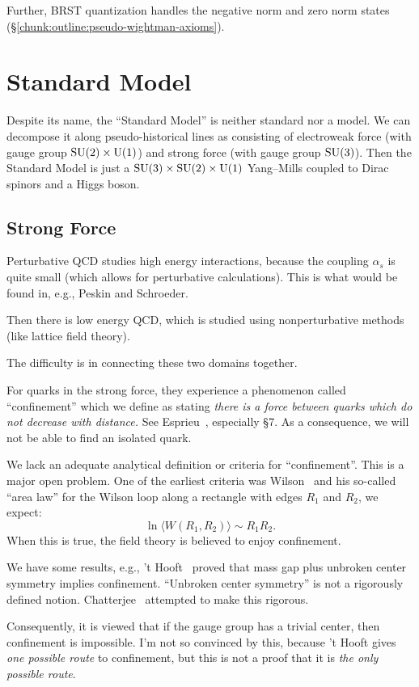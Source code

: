 Further, BRST quantization handles the negative norm and zero norm
states (\S\ref{chunk:outline:pseudo-wightman-axioms}).

\section{Standard Model}

\M
Despite its name, the ``Standard Model'' is neither standard nor a
model. We can decompose it along pseudo-historical lines as consisting
of electroweak force (with gauge group $\operatorname{SU}(2)\times\operatorname{U}(1)$)
and strong force (with gauge group $\operatorname{SU}(3)$). Then the Standard Model
is just a $\operatorname{SU}(3)\times\operatorname{SU}(2)\times\operatorname{U}(1)$ Yang--Mills coupled
to Dirac spinors and a Higgs boson.

\subsection{Strong Force}


\M
Perturbative QCD studies high energy interactions, because the coupling
$\alpha_{s}$ is quite small (which allows for perturbative calculations).
This is what would be found in, e.g., Peskin and Schroeder.

Then there is low energy QCD, which is studied using nonperturbative
methods (like lattice field theory).

The difficulty is in connecting these two domains together.

 For quarks in the strong force, they experience a
phenomenon called ``confinement'' which we define as stating \emph{there
is a force between quarks which do not decrease with distance.} See
Esprieu~\cite{Espriu:1994br}, especially \S7. As a consequence, we will
not be able to find an isolated quark.

We lack an adequate analytical definition or criteria for ``confinement''.
This is a major open problem. One of the earliest criteria was Wilson~\cite{Wilson:1974sk}
and his so-called ``area law'' for the Wilson loop along a
rectangle with edges $R_{1}$ and $R_{2}$, we expect:
\begin{equation}
\ln\langle W(R_{1}, R_{2})\rangle\sim R_{1}R_{2}.
\end{equation}
When this is true, the field theory is believed to enjoy confinement.

\begin{remark}[Folklore]
We have some results, e.g., 't Hooft~\cite{tHooft:1977nqb} proved that
mass gap plus unbroken center symmetry implies confinement.
``Unbroken center symmetry'' is not a rigorously defined notion.
Chatterjee~\cite{Chatterjee:2020nrl} attempted to make this rigorous.

Consequently, it is viewed that if the gauge group has a trivial center,
then confinement is impossible. I'm not so convinced by this, because 't
Hooft gives \emph{one possible route} to confinement, but this is not a
proof that it is \emph{the only possible route}.
\end{remark}


